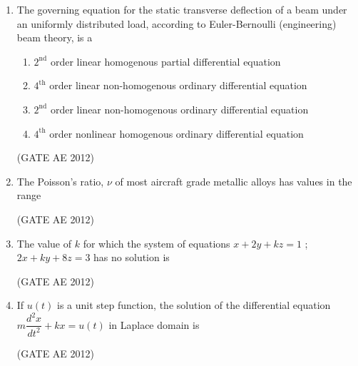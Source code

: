 \documentclass[journal,12pt,onecolumn]{IEEEtran}
\theoremstyle{remark}
\begin{document}
\begin{enumerate}
\item The governing equation for the static transverse deflection of a beam under an uniformly distributed load, according to Euler-Bernoulli (engineering) beam theory, is a
\begin{enumerate}
\item $2^{\text{nd}}$ order linear homogenous partial differential equation
\item $4^{\text{th}}$ order linear non-homogenous ordinary differential equation
\item $2^{\text{nd}}$ order linear non-homogenous ordinary differential equation
\item $4^{\text{th}}$ order nonlinear homogenous ordinary differential equation
\end{enumerate}
\hfill(GATE AE 2012)



\item The Poisson's ratio, $\nu$ of most aircraft grade metallic alloys has values in the range
\begin{enumerate}
\end{enumerate}
\hfill(GATE AE 2012) 



\item The value of $k$ for which the system of equations $x+2y+kz=1$ ; $2x+ky+8z=3$ has no solution is
\begin{enumerate}
\end{enumerate}
\hfill(GATE AE 2012)



\item If $u(t)$ is a unit step function, the solution of the differential equation $m\dfrac{d^2x}{dt^2}+kx=u(t)$ in Laplace domain is
\begin{enumerate}
\end{enumerate}
\hfill(GATE AE 2012) 




\end{enumerate}
\end{document}

